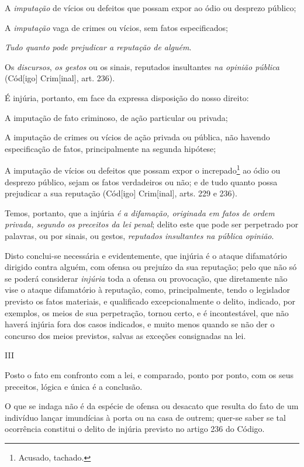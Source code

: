 A \emph{imputação} de vícios ou defeitos que possam expor ao ódio ou
desprezo público;

A \emph{imputação} vaga de crimes ou vícios, sem fatos especificados;

\emph{Tudo quanto pode prejudicar a reputação de alguém}.

Os \emph{discursos}, \emph{os gestos} ou os sinais, reputados
insultantes \emph{na opinião pública} (Cód{[}igo{]} Crim{[}inal{]}, art.
236).

É injúria, portanto, em face da expressa disposição do nosso direito:

A imputação de fato criminoso, de ação particular ou privada;

A imputação de crimes ou vícios de ação privada ou pública, não havendo
especificação de fatos, principalmente na segunda hipótese;

A imputação de vícios ou defeitos que possam expor o increpado\footnote{Acusado,
  tachado.} ao ódio ou desprezo público, sejam os fatos verdadeiros ou
não; e de tudo quanto possa prejudicar a sua reputação (Cód{[}igo{]}
Crim{[}inal{]}, arts. 229 e 236).

Temos, portanto, que a injúria \emph{é a difamação, originada em fatos
de ordem privada, segundo os preceitos da lei penal}; delito este que
pode ser perpetrado por palavras, ou por sinais, ou gestos,
\emph{reputados insultantes na pública opinião}.

Disto conclui-se necessária e evidentemente, que injúria é o ataque
difamatório dirigido contra alguém, com ofensa ou prejuízo da sua
reputação; pelo que não só se poderá considerar \emph{injúria} toda a
ofensa ou provocação, que diretamente não vise o ataque difamatório à
reputação, como, principalmente, tendo o legislador previsto os fatos
materiais, e qualificado excepcionalmente o delito, indicado, por
exemplos, os meios de sua perpetração, tornou certo, e é incontestável,
que não haverá injúria fora dos casos indicados, e muito menos quando se
não der o concurso dos meios previstos, salvas as exceções consignadas
na lei.

III

Posto o fato em confronto com a lei, e comparado, ponto por ponto, com
os seus preceitos, lógica e única é a conclusão.

O que se indaga não é da espécie de ofensa ou desacato que resulta do
fato de um indivíduo lançar imundícias à porta ou na casa de outrem;
quer-se saber se tal ocorrência constitui o delito de injúria previsto
no artigo 236 do Código.

